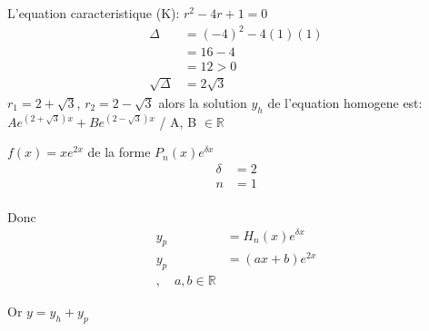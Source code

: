 L'equation caracteristique (K):
$r^2 -4r +1 = 0$
\begin{align*}
    \Delta &= (-4)^2 - 4(1)(1) \\
    &= 16 -4   \\
    &= 12 > 0  \\
    \sqrt\Delta &= 2\sqrt3
\end{align*}
$r_1 = 2 + \sqrt3$, $r_2 = 2 - \sqrt3$ alors la solution $y_h$ de l'equation homogene est: \\
$Ae^{(2+\sqrt3)x} + Be^{(2-\sqrt3)x}$ / A, B $ \in \mathbb{R}$ 

$f(x) = xe^{2x}$ de la forme ${P_n(x) e^{\delta x}}$ \\
\begin{align*}
    \delta &= 2 \\
    n &= 1 \\
\end{align*}

Donc
\begin{align*}
    y_p &= H_n(x)e^{\delta x} \\
    y_p &= (ax + b)e^{2x} \\, \quad a, b \in \mathbb{R}
\end{align*}

Or 
$y = y_h + y_p$ \\

